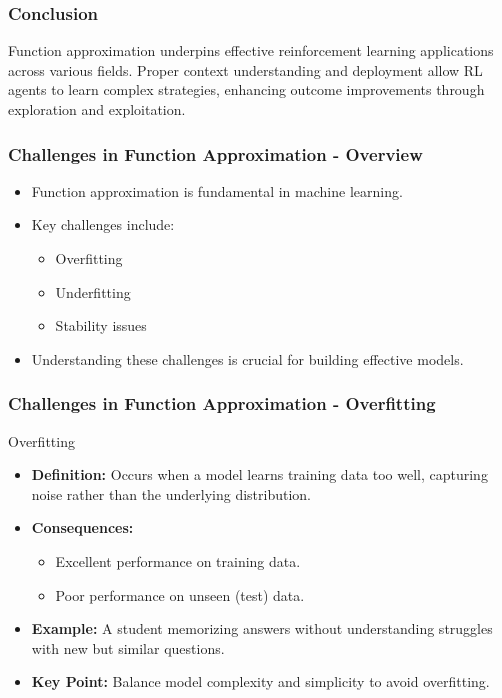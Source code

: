 \documentclass[aspectratio=169]{beamer}
\begin{document}
\begin{frame}[fragile]
    \frametitle{Conclusion}
    Function approximation underpins effective reinforcement learning applications across various fields. Proper context understanding and deployment allow RL agents to learn complex strategies, enhancing outcome improvements through exploration and exploitation.
\end{frame}

\begin{frame}[fragile]
    \frametitle{Challenges in Function Approximation - Overview}
    \begin{itemize}
        \item Function approximation is fundamental in machine learning.
        \item Key challenges include:
        \begin{itemize}
            \item Overfitting
            \item Underfitting
            \item Stability issues
        \end{itemize}
        \item Understanding these challenges is crucial for building effective models.
    \end{itemize}
\end{frame}

\begin{frame}[fragile]
    \frametitle{Challenges in Function Approximation - Overfitting}
    \begin{block}{Overfitting}
        \begin{itemize}
            \item \textbf{Definition:} Occurs when a model learns training data too well, capturing noise rather than the underlying distribution.
            \item \textbf{Consequences:} 
            \begin{itemize}
                \item Excellent performance on training data.
                \item Poor performance on unseen (test) data.
            \end{itemize}
            \item \textbf{Example:} A student memorizing answers without understanding struggles with new but similar questions.
            \item \textbf{Key Point:} Balance model complexity and simplicity to avoid overfitting.
        \end{itemize}
    \end{block}
\end{frame}
\end{document}
